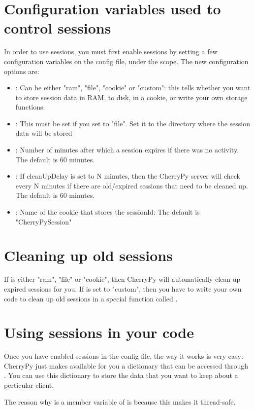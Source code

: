 \documentclass{manual}
\begin{document}
\section{Configuration variables used to control sessions}
In order to use sessions, you must first enable sessions by setting a few configuration variables on the config file, under
the \var{[session]} scope.
The new configuration options are:
\begin{itemize}
\item
{}: Can be either "ram", "file", "cookie" or "custom": this tells whether you want to store session data in RAM, to disk, in a cookie, or write your own storage functions.
\item
{}: This must be set if you set  to "file". Set it to the directory where the session
data will be stored
\item
{}: Number of minutes after which a session expires if there was no activity. The default is 60 minutes.
\item
{}: If cleanUpDelay is set to N minutes, then the CherryPy server will check every N minutes if there are old/expired sessions that need to be cleaned up. The default is 60 minutes.
\item
{}: Name of the cookie that stores the sessionId: The default is "CherryPySession"
\end{itemize}

\section{Cleaning up old sessions}
If  is either "ram", "file" or "cookie", then CherryPy will automatically clean up expired sessions for you. If  is set to "custom", then you have to write your own code to clean up old sessions in a special function called .

\section{Using sessions in your code}
Once you have enabled sessions in the config file, the way it works is very easy: CherryPy just makes available for you
a dictionary that can be accessed through . You can use this dictionary to store the data that you want to keep about a perticular client.

The reason why  is a member variable of  is because this makes it thread-safe.
\end{document}
